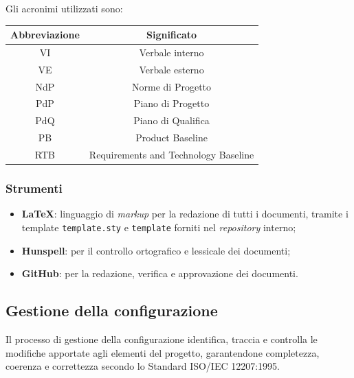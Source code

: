 \documentclass[10pt, letterpaper]{article}
\begin{document}
Gli acronimi utilizzati sono:
\begin{center}
    \begin{tabular}{|c|c|}
        \hline
        \rowcolor{lightgray} \textbf{Abbreviazione} & \textbf{Significato} \\
        \hline
        VI  & Verbale interno \\
        \hline
        VE  & Verbale esterno \\
        \hline
        NdP & Norme di Progetto \\
        \hline
        PdP & Piano di Progetto \\
        \hline
        PdQ & Piano di Qualifica \\
        \hline
        PB  & Product Baseline \\
        \hline
        RTB & Requirements and Technology Baseline \\
        \hline
    \end{tabular}
\end{center}

\subsubsection{Strumenti}
\begin{itemize}
    \item \textbf{\LaTeX}: linguaggio di \textit{markup} per la redazione di tutti i documenti, tramite i template \texttt{template.sty} e \texttt{template} forniti nel \textit{repository} interno;
    \item \textbf{Hunspell}: per il controllo ortografico e lessicale dei documenti;
    \item \textbf{GitHub}: per la redazione, verifica e approvazione dei documenti.
\end{itemize}


\subsection{Gestione della configurazione}
Il processo di gestione della configurazione identifica, traccia e controlla le modifiche apportate agli elementi del progetto, garantendone completezza, coerenza e correttezza secondo lo Standard ISO/IEC 12207:1995.
\end{document}
